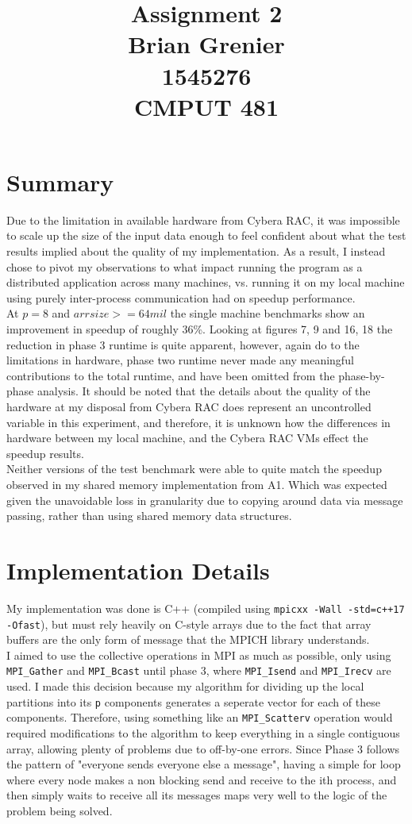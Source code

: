 \documentclass[11pt]{report}
\title{Assignment 2
\\Brian Grenier
\\1545276
\\CMPUT 481}
\begin{document}
\maketitle

\section*{Summary}
Due to the limitation in available hardware from Cybera RAC, it was impossible to scale up the size of
the input data enough to feel confident about what the test results implied about the quality of my
implementation. As a result, I instead chose to pivot my observations to what impact running the program 
as a distributed application across many machines, vs. running it on my local machine using purely
inter-process communication had on speedup performance.\\
At $p=8$ and $arrsize>=64mil$ the single machine benchmarks show an improvement in speedup of
roughly 36\%. Looking at figures 7, 9 and 16, 18 the reduction in phase 3 runtime is quite apparent, however, again do to the limitations in hardware, phase two runtime never made any meaningful contributions to the total runtime, and have been omitted from the phase-by-phase analysis. It should be noted that the details about the quality of the hardware at my disposal from Cybera RAC does represent
an uncontrolled variable in this experiment, and therefore, it is unknown how the differences in hardware
between my local machine, and the Cybera RAC VMs effect the speedup results.\\
Neither versions of the test benchmark were able to quite match the speedup observed in my shared memory implementation from
A1. Which was expected given the unavoidable loss in granularity due to copying around data via message passing, rather than
using shared memory data structures.


\section*{Implementation Details}
My implementation was done is C++ (compiled using \verb|mpicxx -Wall -std=c++17 -Ofast|), but must rely heavily on C-style arrays due to
the fact that array buffers are the only form of message that the MPICH library 
understands.\\
I aimed to use the collective operations in MPI as much as possible, only using \verb|MPI_Gather| and \verb|MPI_Bcast| until phase 3, where \verb|MPI_Isend| and \verb|MPI_Irecv| are used. I made this decision because my algorithm for dividing
up the local partitions into its \verb|p| components generates a seperate vector
for each of these components. Therefore, using something like an \verb|MPI_Scatterv| operation would required modifications to the algorithm to keep everything in a single contiguous array, allowing plenty of problems due to off-by-one errors. Since Phase 3 follows the pattern of "everyone sends everyone else a message", having a simple for loop where every node makes a non blocking send and receive to the ith process, and then simply waits to receive all its messages maps very well to the logic of the problem being solved.
\end{document}
